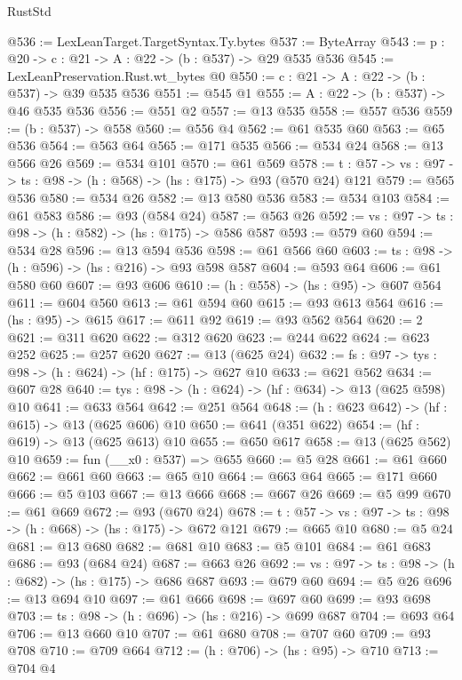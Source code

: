 \begin{lexlean}{RustStd}
\begin{coremodule}
@536 := LexLeanTarget.TargetSyntax.Ty.bytes
@537 := ByteArray
@543 := {p : @20} -> {c : @21} -> {A : @22} -> (b : @537) -> @29 @535 @536
@545 := LexLeanPreservation.Rust.wt_bytes @0
@550 := {c : @21} -> {A : @22} -> (b : @537) -> @39 @535 @536
@551 := @545 @1
@555 := {A : @22} -> (b : @537) -> @46 @535 @536
@556 := @551 @2
@557 := @13 @535
@558 := @557 @536
@559 := (b : @537) -> @558
@560 := @556 @4
@562 := @61 @535 @60
@563 := @65 @536
@564 := @563 @64
@565 := @171 @535
@566 := @534 @24
@568 := @13 @566 @26
@569 := @534 @101
@570 := @61 @569
@578 := {t : @57} -> {vs : @97} -> {ts : @98} -> (h : @568) -> (hs : @175) -> @93 (@570 @24) @121
@579 := @565 @536
@580 := @534 @26
@582 := @13 @580 @536
@583 := @534 @103
@584 := @61 @583
@586 := @93 (@584 @24)
@587 := @563 @26
@592 := {vs : @97} -> {ts : @98} -> (h : @582) -> (hs : @175) -> @586 @587
@593 := @579 @60
@594 := @534 @28
@596 := @13 @594 @536
@598 := @61 @566 @60
@603 := {ts : @98} -> (h : @596) -> (hs : @216) -> @93 @598 @587
@604 := @593 @64
@606 := @61 @580 @60
@607 := @93 @606
@610 := (h : @558) -> (hs : @95) -> @607 @564
@611 := @604 @560
@613 := @61 @594 @60
@615 := @93 @613 @564
@616 := (hs : @95) -> @615
@617 := @611 @92
@619 := @93 @562 @564
@620 := 2
@621 := @311 @620
@622 := @312 @620
@623 := @244 @622
@624 := @623 @252
@625 := @257 @620
@627 := @13 (@625 @24)
@632 := {fs : @97} -> {tys : @98} -> (h : @624) -> (hf : @175) -> @627 @10
@633 := @621 @562
@634 := @607 @28
@640 := {tys : @98} -> (h : @624) -> (hf : @634) -> @13 (@625 @598) @10
@641 := @633 @564
@642 := @251 @564
@648 := (h : @623 @642) -> (hf : @615) -> @13 (@625 @606) @10
@650 := @641 (@351 @622)
@654 := (hf : @619) -> @13 (@625 @613) @10
@655 := @650 @617
@658 := @13 (@625 @562) @10
@659 := fun (__x0 : @537) => @655
@660 := @5 @28
@661 := @61 @660
@662 := @661 @60
@663 := @65 @10
@664 := @663 @64
@665 := @171 @660
@666 := @5 @103
@667 := @13 @666
@668 := @667 @26
@669 := @5 @99
@670 := @61 @669
@672 := @93 (@670 @24)
@678 := {t : @57} -> {vs : @97} -> {ts : @98} -> (h : @668) -> (hs : @175) -> @672 @121
@679 := @665 @10
@680 := @5 @24
@681 := @13 @680
@682 := @681 @10
@683 := @5 @101
@684 := @61 @683
@686 := @93 (@684 @24)
@687 := @663 @26
@692 := {vs : @97} -> {ts : @98} -> (h : @682) -> (hs : @175) -> @686 @687
@693 := @679 @60
@694 := @5 @26
@696 := @13 @694 @10
@697 := @61 @666
@698 := @697 @60
@699 := @93 @698
@703 := {ts : @98} -> (h : @696) -> (hs : @216) -> @699 @687
@704 := @693 @64
@706 := @13 @660 @10
@707 := @61 @680
@708 := @707 @60
@709 := @93 @708
@710 := @709 @664
@712 := (h : @706) -> (hs : @95) -> @710
@713 := @704 @4

\end{coremodule}
\end{lexlean}
